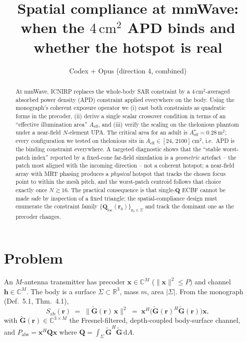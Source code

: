\documentclass[journal]{IEEEtran}
\newcommand{\rr}{\bm{r}}
\newcommand{\xx}{\bm{x}}
\newcommand{\hh}{\bm{h}}
\newcommand{\Gtil}{\widetilde{\mathbf{G}}}
\newcommand{\Sab}{S_{\mathrm{ab}}}
\newcommand{\Pabs}{P_{\mathrm{abs}}}
\newcommand{\Q}{\mathbf{Q}}
\newcommand{\Qloc}{\Q_{\mathrm{loc}}}
\newcommand{\Aeff}{A_{\mathrm{eff}}}
\begin{document}
\title{Spatial compliance at mmWave: \\
  when the $4\,\mathrm{cm}^2$ APD binds and whether the hotspot is real}
\author{Codex + Opus (direction 4, combined)}
\maketitle

\begin{abstract}
At mmWave, ICNIRP replaces the whole-body SAR constraint by a
$4\,\mathrm{cm}^2$-averaged absorbed power density (APD) constraint
applied everywhere on the body. Using the monograph's coherent
exposure operator we (i) cast both constraints as quadratic forms in
the precoder, (ii) derive a single scalar crossover condition in terms
of an ``effective illumination area'' $\Aeff$, and (iii) verify the
scaling on the thelonious phantom under a near-field $N$-element UPA.
The critical area for an adult is $\Aeff^\star=0.28\,\mathrm m^2$;
every configuration we tested on thelonious sits in
$\Aeff\in[24,\,2100]\,\mathrm{cm}^2$, i.e.\ APD is the binding
constraint everywhere. A targeted diagnostic shows that the
``stable worst-patch index'' reported by a fixed-cone far-field
simulation is a \emph{geometric} artefact -- the patch most aligned
with the incoming direction -- not a coherent hotspot; a near-field
array with MRT phasing produces a \emph{physical} hotspot that tracks
the chosen focus point to within the mesh pitch, and the worst-patch
centroid follows that choice exactly once $N\gtrsim 16$. The
practical consequence is that single-$\Q$ ECBF cannot be made safe
by inspection of a fixed triangle; the spatial-compliance design
must enumerate the constraint family $\{\Qloc(\rr_0)\}_{\rr_0\in\Sigma}$
and track the dominant one as the precoder changes.
\end{abstract}

\section{Problem}\label{sec:problem}

An $M$-antenna transmitter has precoder $\xx\in\mathbb{C}^M$
($\lVert\xx\rVert^2\le P$) and channel $\hh\in\mathbb{C}^M$. The body
is a surface $\Sigma\subset\mathbb{R}^3$, mass $m$, area $|\Sigma|$.
From the monograph (Def.~5.1, Thm.~4.1),
\begin{equation}\label{eq:Sab}
  \Sab(\rr) \;=\; \bigl\lVert\Gtil(\rr)\,\xx\bigr\rVert^2
  \;=\; \xx^H\bigl(\Gtil(\rr)^H\Gtil(\rr)\bigr)\xx ,
\end{equation}
with $\Gtil(\rr)\in\mathbb{C}^{3\times M}$ the Fresnel-filtered,
depth-coupled body-surface channel, and
$\Pabs=\xx^H\Q\xx$ where $\Q=\int_\Sigma\Gtil^H\Gtil\,\mathrm{d}A$.
\end{document}
